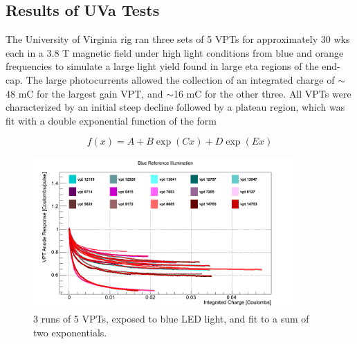 \subsection{Results of UVa Tests}
\label{vpt_results_description}

\par The University of Virginia rig ran three sets of 5 VPTs for
approximately 30 wks each in a 3.8 T magnetic field under high light
conditions from blue and orange frequencies to simulate a large light
yield found in large eta regions of the end-cap.  The large
photocurrents allowed the collection of an integrated charge of
$\sim$48 mC for the largest gain VPT, and 
$\sim$16 mC for the other three.   All VPTs were characterized by an
initial steep decline followed by a plateau region, which was fit with
a double exponential function of the form   

\begin{equation}
f(x) = A + B\exp {(Cx)} + D\exp {(Ex)}
\end{equation}

\begin{figure}[h]
   \centering
  \includegraphics[width=0.9\textwidth]{Figures/CMS_Diagrams/UVaRig__all_good_runs_Overlay___blue_reference_anode__vs__integrated_charge__rolling_average_of_10pts__normalized_to_start_of_run__fitted_with_Double_Exponential.png}
  \caption{3 runs of 5 VPTs, exposed to blue LED light, and fit to a
    sum of two exponentials.} \label{fig:uva_rig_blue_fit}
\end{figure}

